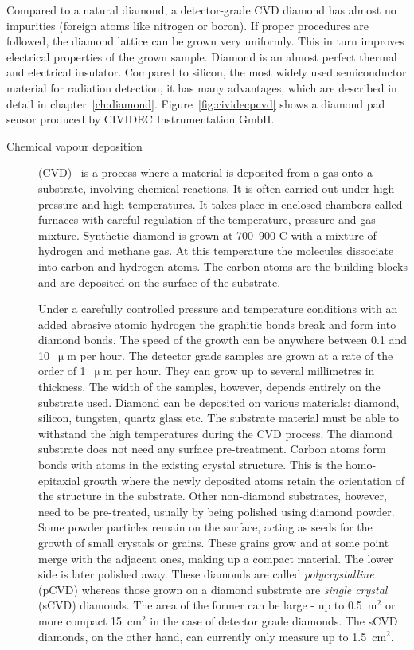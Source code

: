 Compared to a natural diamond, a detector-grade CVD diamond has almost no impurities (foreign atoms like nitrogen or boron). If proper procedures are followed, the diamond lattice can be grown very uniformly. This in turn improves electrical properties of the grown sample. Diamond is an almost perfect thermal and electrical insulator. Compared to silicon, the most widely used semiconductor material for radiation detection, it has many advantages, which are described in detail in chapter~\ref{ch:diamond}. Figure~\ref{fig:cividecpcvd} shows a diamond pad sensor produced by CIVIDEC Instrumentation GmbH.

\begin{description}
\item[Chemical vapour deposition] (CVD)~\cite{} is a process where a material is deposited from a gas onto a substrate, involving chemical reactions. It is often carried out under high pressure and high temperatures. It takes place in enclosed chambers called furnaces with careful regulation of the temperature, pressure and gas mixture. Synthetic diamond is grown at 700--900 \textdegree C with a mixture of hydrogen and methane gas. At this temperature the molecules dissociate into carbon and hydrogen atoms. The carbon atoms are the building blocks and are deposited on the surface of the substrate.

Under a carefully controlled pressure and temperature conditions with an added abrasive atomic hydrogen the graphitic bonds break and form into diamond bonds. The speed of the growth can be anywhere between 0.1 and 10~$\upmu$m per hour. The detector grade samples are grown at a rate of the order of 1~$\upmu$m per hour. They can grow up to several millimetres in thickness. The width of the samples, however, depends entirely on the substrate used. Diamond can be deposited on various materials: diamond, silicon, tungsten, quartz glass etc. The substrate material must be able to withstand the high temperatures during the CVD process. The diamond substrate does not need any surface pre-treatment. Carbon atoms form bonds with atoms in the existing crystal structure. This is the homo-epitaxial growth where the newly deposited atoms retain the orientation of the structure in the substrate. Other non-diamond substrates, however, need to be pre-treated, usually by being polished using diamond powder. Some powder particles remain on the surface, acting as seeds for the growth of small crystals or grains. These grains grow and at some point merge with the adjacent ones, making up a compact material. The lower side is later polished away. These diamonds are called \emph{polycrystalline} (pCVD) whereas those grown on a diamond substrate are \emph{single crystal} (sCVD) diamonds. The area of the former can be large - up to 0.5~m$^2$ or more compact 15~cm$^2$ in the case of detector grade diamonds. The sCVD diamonds, on the other hand, can currently only measure up to 1.5~cm$^2$.
\end{description}

